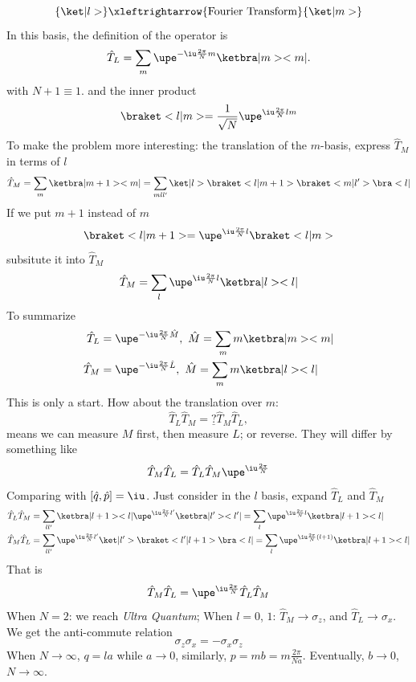 \[
  \{\ket|l>\} \xleftrightarrow{\text{Fourier Transform}} \{\ket|m>\}
\]
In this basis, the definition of the operator is
\begin{equation}
  \hat T_L = \sum_m \upe^{-\iu \frac{2\pi}{N}m} \ketbra|m><m|.
\end{equation}
with $N + 1 \equiv 1$.
and the inner product
\begin{equation}
  \braket<l|m> = \frac1{\sqrt N}\upe^{\iu\frac{2\pi}{N}lm}
\end{equation}
To make the problem more interesting: the translation of the $m$-basis,
express $\hat T_M$ in terms of $l$
\begin{equation}
  \hat T_M = \sum_m \ketbra|m + 1><m|
= \sum_{mll'} \ket|l>\braket<l|m+1>\braket<m|l'>\bra<l|
\end{equation}
If we put $m + 1$ instead of $m$
\[
  \braket<l|m + 1> = \upe^{\iu\frac{2\pi}{N}l} \braket<l|m>
\]
subsitute it into $\hat T_M$
\[
  \hat T_M = \sum_l \upe^{\iu\frac{2\pi}{N}l}\ketbra|l><l|
\]
To summarize
\begin{align}
  \hat T_L & = \upe^{-\iu\frac{2\pi}{N}\hat M}, ~
  \hat M = \sum_m m\ketbra|m><m|\\
  \hat T_M & = \upe^{-\iu\frac{2\pi}{N}\hat L}, ~
  \hat M = \sum_m m\ketbra|l><l|
\end{align}
This is only a start. How about the translation over $m$:
\[
  \hat T_L \hat T_M = \underline? \hat T_M \hat T_L,
\]
means we can measure $M$ first, then measure $L$; or reverse.
They will differ by something like
\[
  \hat T_M \hat T_L = \hat T_L \hat T_M \upe^{\iu\frac{2\pi}{N}}
\]
Comparing with $[\hat q,\hat p] = \iu$.
Just consider in the $l$ basis, expand $\hat T_L$ and $\hat T_M$
\begin{align*}
  \hat T_L \hat T_M & = \sum_{ll'} \ketbra|l + 1><l| \upe^{\iu\frac{2\pi}{N}l'}\ketbra|l'><l'|
= \sum_l \upe^{\iu\frac{2\pi}{N}l}\ketbra|l + 1><l|\\
  \hat T_M \hat T_L & = \sum_{ll'} \upe^{\iu\frac{2\pi}{N}l'} \ket|l'>\braket<l'|l + 1>\bra<l|
= \sum_l \upe^{\iu\frac{2\pi}{N}(l+1)} \ketbra|l + 1><l|
\end{align*}
That is
\begin{equation}
  \hat T_M \hat T_L = \upe^{\iu\frac{2\pi}{N}}\hat T_L \hat T_M
  \label{1.7}
\end{equation}
When $N = 2$: we reach \emph{Ultra Quantum};
When $l = 0$, $1$: $\hat T_M \to \sigma_z$, and $\hat T_L \to \sigma_x$.
We get the anti-commute relation
\begin{equation}
  \sigma_z \sigma_x = -\sigma_x\sigma_z
\end{equation}
When $N \to \infty$, $q = la$ while $a \to 0$,
similarly, $p = mb = m\frac{2\pi}{Na}$. Eventually, $b \to 0$, $N \to \infty$.


